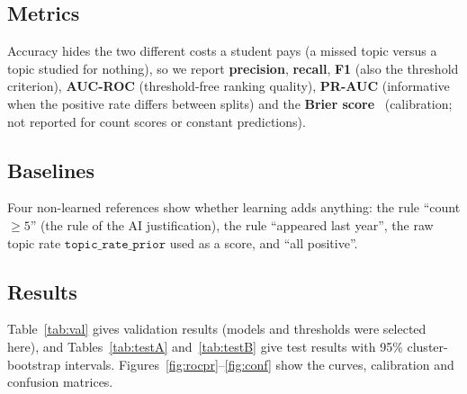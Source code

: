 \documentclass[11pt,a4paper]{article}
\newcommand{\trp}{\texttt{topic\_rate\_prior}}
\begin{document}
\subsection{Metrics}
Accuracy hides the two different costs a student pays (a missed topic versus a topic studied for nothing), so we report
\textbf{precision}, \textbf{recall}, \textbf{F1} (also the threshold criterion), \textbf{AUC-ROC} (threshold-free ranking
quality), \textbf{PR-AUC} (informative when the positive rate differs between splits) and the \textbf{Brier score}~\cite{brier}
(calibration; not reported for count scores or constant predictions).

\subsection{Baselines}
Four non-learned references show whether learning adds anything: the rule ``count $\ge 5$'' (the rule of the AI
justification), the rule ``appeared last year'', the raw topic rate $\trp$ used as a score, and ``all positive''.

\subsection{Results}
Table~\ref{tab:val} gives validation results (models and thresholds were selected here), and Tables~\ref{tab:testA}
and~\ref{tab:testB} give test results with 95\% cluster-bootstrap intervals. Figures~\ref{fig:rocpr}--\ref{fig:conf} show the
curves, calibration and confusion matrices.

\begin{table}[!htb]
\centering
\small
{}
\caption{Validation results (383 rows, 45 target exams). Thresholds of learned models and of the raw topic rate maximise F1
on this split, so this table is optimistic for them.}
\label{tab:val}
\end{table}
\end{document}
